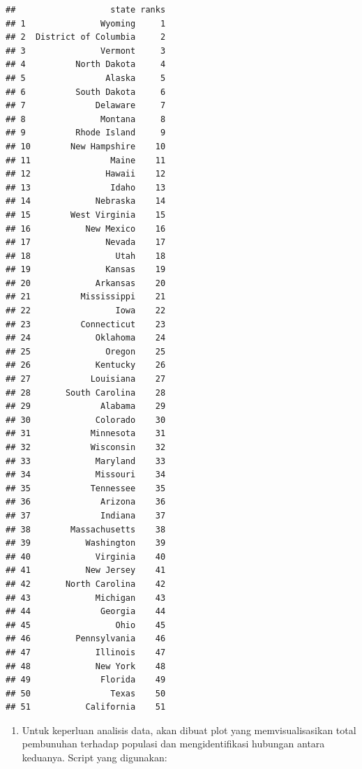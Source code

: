 \documentclass[
]{article}
\newenvironment{Shaded}{\begin{snugshade}}{\end{snugshade}}
\newcommand{\DecValTok}[1]{\textcolor[rgb]{0.00,0.00,0.81}{#1}}
\newcommand{\FunctionTok}[1]{\textcolor[rgb]{0.00,0.00,0.00}{#1}}
\newcommand{\NormalTok}[1]{#1}
\newcommand{\OtherTok}[1]{\textcolor[rgb]{0.56,0.35,0.01}{#1}}
\newcommand{\SpecialCharTok}[1]{\textcolor[rgb]{0.00,0.00,0.00}{#1}}
\providecommand{\tightlist}{%
  \setlength{\itemsep}{0pt}\setlength{\parskip}{0pt}}
\begin{document}
\begin{verbatim}
##                   state ranks
## 1               Wyoming     1
## 2  District of Columbia     2
## 3               Vermont     3
## 4          North Dakota     4
## 5                Alaska     5
## 6          South Dakota     6
## 7              Delaware     7
## 8               Montana     8
## 9          Rhode Island     9
## 10        New Hampshire    10
## 11                Maine    11
## 12               Hawaii    12
## 13                Idaho    13
## 14             Nebraska    14
## 15        West Virginia    15
## 16           New Mexico    16
## 17               Nevada    17
## 18                 Utah    18
## 19               Kansas    19
## 20             Arkansas    20
## 21          Mississippi    21
## 22                 Iowa    22
## 23          Connecticut    23
## 24             Oklahoma    24
## 25               Oregon    25
## 26             Kentucky    26
## 27            Louisiana    27
## 28       South Carolina    28
## 29              Alabama    29
## 30             Colorado    30
## 31            Minnesota    31
## 32            Wisconsin    32
## 33             Maryland    33
## 34             Missouri    34
## 35            Tennessee    35
## 36              Arizona    36
## 37              Indiana    37
## 38        Massachusetts    38
## 39           Washington    39
## 40             Virginia    40
## 41           New Jersey    41
## 42       North Carolina    42
## 43             Michigan    43
## 44              Georgia    44
## 45                 Ohio    45
## 46         Pennsylvania    46
## 47             Illinois    47
## 48             New York    48
## 49              Florida    49
## 50                Texas    50
## 51           California    51
\end{verbatim}

\begin{enumerate}
\def\labelenumi{\arabic{enumi}.}
\setcounter{enumi}{6}
\tightlist
\item
  Untuk keperluan analisis data, akan dibuat plot yang memvisualisasikan
  total pembunuhan terhadap populasi dan mengidentifikasi hubungan
  antara keduanya. Script yang digunakan:
\end{enumerate}

\begin{Shaded}
\end{Shaded}
\end{document}
